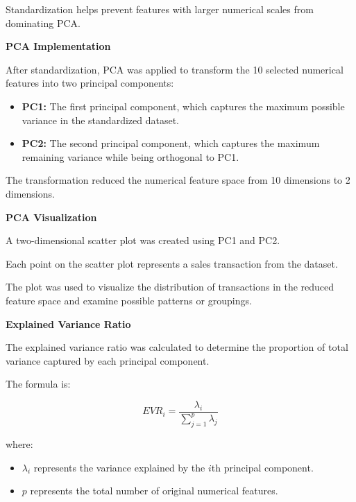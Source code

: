 \documentclass[12pt,a4paper]{report}
\begin{document}
Standardization helps prevent
features with larger numerical
scales from dominating PCA.

\medskip

\noindent\textbf{PCA Implementation}

After standardization, PCA was
applied to transform the
10 selected numerical features
into two principal components:

\begin{itemize}

    \item \textbf{PC1:}
    The first principal component,
    which captures the maximum
    possible variance in the
    standardized dataset.

    \item \textbf{PC2:}
    The second principal component,
    which captures the maximum
    remaining variance while being
    orthogonal to PC1.

\end{itemize}

The transformation reduced the
numerical feature space from
10 dimensions to 2 dimensions.

\medskip

\noindent\textbf{PCA Visualization}

A two-dimensional scatter plot
was created using PC1 and PC2.

Each point on the scatter plot
represents a sales transaction
from the dataset.

The plot was used to visualize
the distribution of transactions
in the reduced feature space
and examine possible patterns
or groupings.

\medskip

\noindent\textbf{Explained Variance Ratio}

The explained variance ratio
was calculated to determine
the proportion of total variance
captured by each principal component.

The formula is:

\[
EVR_i =
\frac{\lambda_i}
{\sum_{j=1}^{p}\lambda_j}
\]

where:

\begin{itemize}

    \item $\lambda_i$ represents
    the variance explained by
    the $i$th principal component.

    \item $p$ represents the
    total number of original
    numerical features.

\end{itemize}
\end{document}
